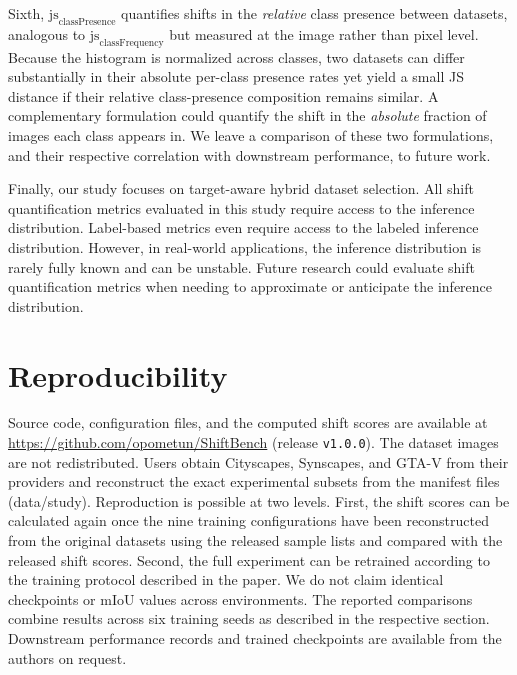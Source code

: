 \documentclass[conference]{IEEEtran}
\begin{document}
Sixth, $\text{js}_{\text{classPresence}}$ quantifies shifts in the \textit{relative} class presence between datasets, analogous to $\text{js}_{\text{classFrequency}}$ but measured at the image rather than pixel level. Because the histogram is normalized across classes, two datasets can differ substantially in their absolute per-class presence rates yet yield a small JS distance if their relative class-presence composition remains similar. A complementary formulation could quantify the shift in the \textit{absolute} fraction of images each class appears in. We leave a comparison of these two formulations, and their respective correlation with downstream performance, to future work.

Finally, our study focuses on target-aware hybrid dataset selection. All shift quantification metrics evaluated in this study require access to the inference distribution. Label-based metrics even require access to the labeled inference distribution. However, in real-world applications, the inference distribution is rarely fully known and can be unstable. Future research could evaluate shift quantification metrics when needing to approximate or anticipate the inference distribution.

\section{Reproducibility}
Source code, configuration files, and the computed shift scores are available at \url{https://github.com/opometun/ShiftBench} (release \texttt{v1.0.0}).
The dataset images are not redistributed. Users obtain Cityscapes, Synscapes, and GTA-V from their providers 
and reconstruct the exact experimental subsets from the manifest files (data/study). 
Reproduction is possible at two levels. First, the shift scores can be calculated again once the nine training configurations have 
been reconstructed from the original datasets using the released sample lists and compared with the released shift scores. 
Second, the full experiment can be retrained according to the training protocol described in the paper. We do not claim identical checkpoints 
or mIoU values across environments. The reported comparisons combine results across six training seeds as described in the respective section. 
Downstream performance records and trained checkpoints are available from the authors on request.

\clearpage


\end{document}
